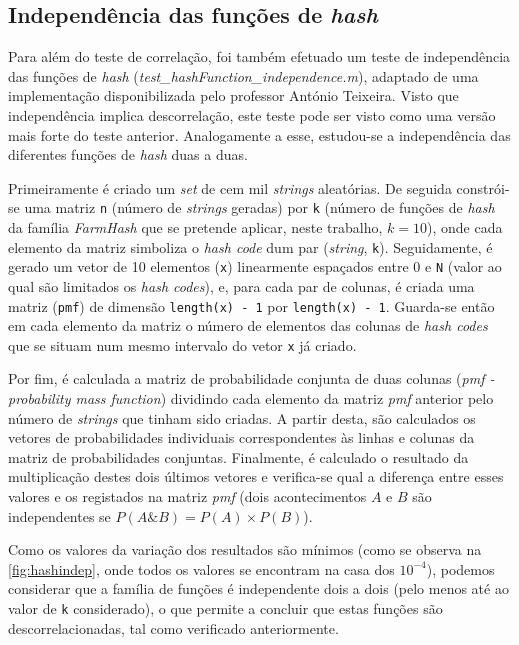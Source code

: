 \documentclass[a4paper,11pt,openright,oneside]{report}
\begin{document}
\subsection{Independência das funções de \textit{hash}}
\label{subsec.hashindep}

Para além do teste de correlação, foi também efetuado um teste de independência das funções de \textit{hash} (\textit{test\_hashFunction\_independence.m}), adaptado de uma implementação disponibilizada pelo professor António Teixeira. Visto que independência implica descorrelação, este teste pode ser visto como uma versão mais forte do teste anterior. Analogamente a esse, estudou-se a independência das diferentes funções de \textit{hash} duas a duas.

Primeiramente é criado um \textit{set} de cem mil \textit{strings} aleatórias. De seguida constrói-se uma matriz \texttt{n} (número de \textit{strings} geradas) por \texttt{k} (número de funções de \textit{hash} da família \textit{FarmHash} que se pretende aplicar, neste trabalho, $k = 10$),  onde cada elemento da matriz simboliza o \textit{hash code} dum par (\textit{string}, \texttt{k}). Seguidamente, é gerado um vetor de 10 elementos (\texttt{x}) linearmente espaçados entre 0 e \texttt{N} (valor ao qual são limitados os \textit{hash codes}), e, para cada par de colunas, é criada uma matriz (\texttt{pmf}) de dimensão \verb|length(x) - 1| por \verb|length(x) - 1|. Guarda-se então em cada elemento da matriz o número de elementos das colunas de \textit{hash codes} que se situam num mesmo intervalo do vetor \texttt{x} já criado.

Por fim, é calculada a matriz de probabilidade conjunta de duas colunas (\textit{pmf - probability mass function}) dividindo cada elemento da matriz \textit{pmf} anterior pelo número de \textit{strings} que tinham sido criadas. A partir desta, são calculados os vetores de probabilidades individuais correspondentes às linhas e colunas da matriz de probabilidades conjuntas. Finalmente, é calculado o resultado da multiplicação destes dois últimos vetores e verifica-se qual a diferença entre esses valores e os registados na matriz \textit{pmf} (dois acontecimentos $A$ e $B$ são independentes se $P(A\&B) = P(A) \times P(B)$).

Como os valores da variação dos resultados são mínimos (como se observa na \autoref{fig:hashindep}, onde todos os valores se encontram na casa dos $10^{-4}$), podemos considerar que a família de funções é independente dois a dois (pelo menos até ao valor de \texttt{k} considerado), o que permite a concluir que estas funções são descorrelacionadas, tal como verificado anteriormente.
\end{document}
